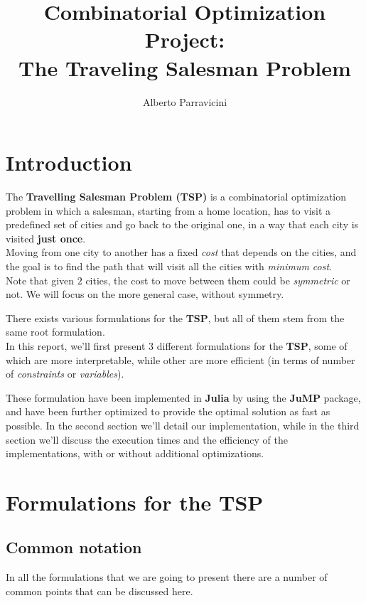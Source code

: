 \documentclass[
12pt,
a4paper,
oneside,
headinclude,
footinclude]{article}
\title{\textbf{Combinatorial Optimization Project: \\ The Traveling Salesman Problem}}
\author{{Alberto Parravicini}}
\date{}	%
\begin{document}
    \maketitle
    \setcounter{page}{1}
    
    \section{Introduction}
    
    The \textbf{Travelling Salesman Problem (TSP)} is a combinatorial optimization problem in which a salesman, starting from a home location, has to visit a predefined set of cities and go back to the original one, in a way that each city is visited \textbf{just once}. \\
    Moving from one city to another has a fixed \textit{cost} that depends on the cities, and the goal is to find the path that will visit all the cities with \textit{minimum cost}. \\
    Note that given $2$ cities, the cost to move between them could be \textit{symmetric} or not. We will focus on the more general case, without symmetry.
    
    There exists various formulations for the \textbf{TSP}, but all of them stem from the same root formulation.\\
    In this report, we'll first present $3$ different formulations for the \textbf{TSP}, some of which are more interpretable, while other are more efficient (in terms of number of \textit{constraints} or \textit{variables}).
    
    These formulation have been implemented in \textbf{Julia} by using the \textbf{JuMP} package, and have been further optimized to provide the optimal solution as fast as possible. In the second section we'll detail our implementation, while in the third section we'll discuss the execution times and the efficiency of the implementations, with or without additional optimizations.
    
    \section{Formulations for the TSP}
    
    \subsection{Common notation}
    In all the formulations that we are going to present there are a number of common points that can be discussed here. 
    
\end{document}
